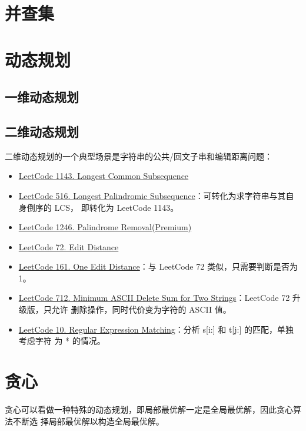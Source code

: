 \section{并查集}

\section{动态规划}

\subsection{一维动态规划}

\subsection{二维动态规划}
二维动态规划的一个典型场景是字符串的公共/回文子串和编辑距离问题：
\begin{itemize}
  \item
    \href{https://leetcode.com/problems/longest-common-subsequence/}{LeetCode 1143. Longest Common Subsequence}
  \item
    \href{https://leetcode.com/problems/longest-palindromic-subsequence/}{LeetCode
      516. Longest Palindromic Subsequence}：可转化为求字符串与其自身倒序的 LCS，
    即转化为 LeetCode 1143。
  \item
    \href{https://leetcode.com/problems/palindrome-removal/}{LeetCode 1246. Palindrome Removal(Premium)}
  \item
    \href{https://leetcode.com/problems/edit-distance/}{LeetCode 72. Edit Distance}
  \item
    \href{https://leetcode.com/problems/one-edit-distance}{LeetCode 161. One
      Edit Distance}：与 LeetCode 72 类似，只需要判断是否为 1。
  \item
    \href{https://leetcode.com/problems/minimum-ascii-delete-sum-for-two-strings/}{LeetCode
      712. Minimum ASCII Delete Sum for Two Strings}：LeetCode 72 升级版，只允许
    删除操作，同时代价变为字符的 ASCII 值。
  \item
    \href{https://leetcode.com/problems/regular-expression-matching/}{LeetCode
      10. Regular Expression Matching}：分析 s[i:] 和 t[j:] 的匹配，单独考虑字符
    为 * 的情况。
\end{itemize}

\section{贪心}
贪心可以看做一种特殊的动态规划，即局部最优解一定是全局最优解，因此贪心算法不断选
择局部最优解以构造全局最优解。

